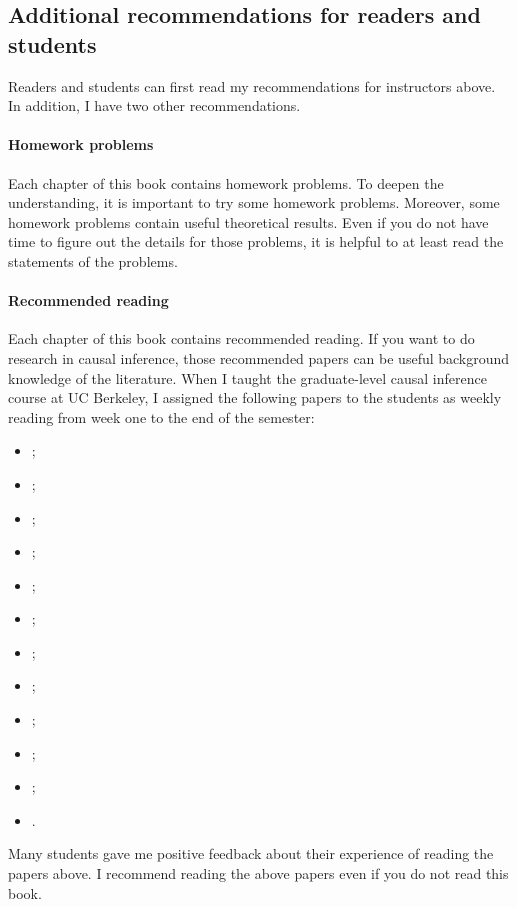 \subsection*{Additional recommendations for readers and students}



Readers and students can first read my recommendations for instructors above.  In addition, I have two other recommendations. 


\paragraph*{Homework problems}
Each chapter of this book contains homework problems. To deepen the understanding,  it is important to try some homework problems. Moreover, some homework problems contain useful theoretical results. Even if you do not have time to figure out the details for those problems,  it is helpful to at least read the statements of the problems. 

\paragraph*{Recommended reading}
Each chapter of this book contains recommended reading.  If you want to do research in causal inference, those recommended papers can be useful background knowledge of the literature.  When I taught the graduate-level causal inference course at UC Berkeley, I assigned the following papers to the students as weekly reading from week one to the end of the semester:  
\begin{itemize}
\item 
\citet{bickel1975sex}; 
\item 
\citet{holland1986statistics};
\item
\citet{miratrix:2013};
\item
\citet{lin2013};
\item 
\citet{li2018asymptotic};
\item 
\citet{rosenbaum1983central};
\item 
\citet{lunceford2004stratification};
\item
\citet{ding2016sensitivity};
\item
\citet{pearl1995causal};
\item
\citet{angrist1996identification};
\item
\citet{imbens2014instrumental};
\item
\citet{frangakis2002principal}. 
\end{itemize}
Many students gave me positive feedback about their experience of reading the papers above. 
I recommend reading the above papers even if you do not read this book. 





